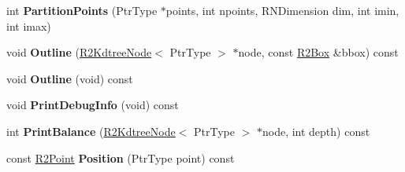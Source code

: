 \begin{DoxyCompactItemize}
\item 
int {\bfseries Partition\+Points} (Ptr\+Type $\ast$points, int npoints, R\+N\+Dimension dim, int imin, int imax)\hypertarget{class_r2_kdtree_a88f16452b2dab3d407b487e038499395}{}\label{class_r2_kdtree_a88f16452b2dab3d407b487e038499395}

\item 
void {\bfseries Outline} (\hyperlink{class_r2_kdtree_node}{R2\+Kdtree\+Node}$<$ Ptr\+Type $>$ $\ast$node, const \hyperlink{class_r2_box}{R2\+Box} \&bbox) const \hypertarget{class_r2_kdtree_a5683df6fd2bd93b3e101a0d77e9e7751}{}\label{class_r2_kdtree_a5683df6fd2bd93b3e101a0d77e9e7751}

\item 
void {\bfseries Outline} (void) const \hypertarget{class_r2_kdtree_aad109a2eb34ec05b7fb6e4aed2da5a59}{}\label{class_r2_kdtree_aad109a2eb34ec05b7fb6e4aed2da5a59}

\item 
void {\bfseries Print\+Debug\+Info} (void) const \hypertarget{class_r2_kdtree_a92f8645b4f4beb5c552c2d66dcdb20b0}{}\label{class_r2_kdtree_a92f8645b4f4beb5c552c2d66dcdb20b0}

\item 
int {\bfseries Print\+Balance} (\hyperlink{class_r2_kdtree_node}{R2\+Kdtree\+Node}$<$ Ptr\+Type $>$ $\ast$node, int depth) const \hypertarget{class_r2_kdtree_a2cbb3ebb969fd9217d08e86f4d16f52f}{}\label{class_r2_kdtree_a2cbb3ebb969fd9217d08e86f4d16f52f}

\item 
const \hyperlink{class_r2_point}{R2\+Point} {\bfseries Position} (Ptr\+Type point) const \hypertarget{class_r2_kdtree_a229da8cb8fc3efdf6ce577d4c2fb7a52}{}\label{class_r2_kdtree_a229da8cb8fc3efdf6ce577d4c2fb7a52}

\end{DoxyCompactItemize}
